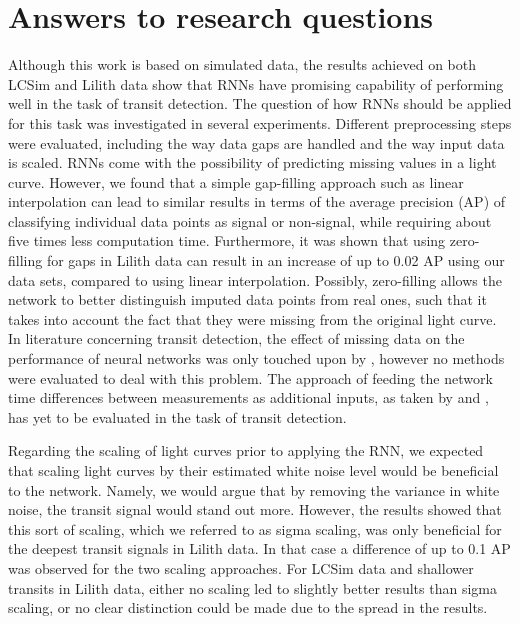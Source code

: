 
\section{Answers to research questions}

Although this work is based on simulated data, the results achieved on both LCSim and Lilith data show that RNNs have promising capability of performing well in the task of transit detection. The question of how RNNs should be applied for this task was investigated in several experiments. Different preprocessing steps were evaluated, including the way data gaps are handled and the way input data is scaled. RNNs come with the possibility of predicting missing values in a light curve. However, we found that a simple gap-filling approach such as linear interpolation can lead to similar results in terms of the average precision (AP) of classifying individual data points as signal or non-signal, while requiring about five times less computation time. Furthermore, it was shown that using zero-filling for gaps in Lilith data can result in an increase of up to 0.02 AP using our data sets, compared to using linear interpolation. Possibly, zero-filling allows the network to better distinguish imputed data points from real ones, such that it takes into account the fact that they were missing from the original light curve. In literature concerning transit detection, the effect of missing data on the performance of neural networks was only touched upon by \cite{pearson2018searching}, however no methods were evaluated to deal with this problem. The approach of feeding the network time differences between measurements as additional inputs, as taken by \cite{naul2018recurrent} and \cite{becker2020scalable}, has yet to be evaluated in the task of transit detection.

Regarding the scaling of light curves prior to applying the RNN, we expected that scaling light curves by their estimated white noise level would be beneficial to the network. Namely, we would argue that by removing the variance in white noise, the transit signal would stand out more. However, the results showed that this sort of scaling, which we referred to as sigma scaling, was only beneficial for the deepest transit signals in Lilith data. In that case a difference of up to 0.1 AP was observed for the two scaling approaches. For LCSim data and shallower transits in Lilith data, either no scaling led to slightly better results than sigma scaling, or no clear distinction could be made due to the spread in the results.

